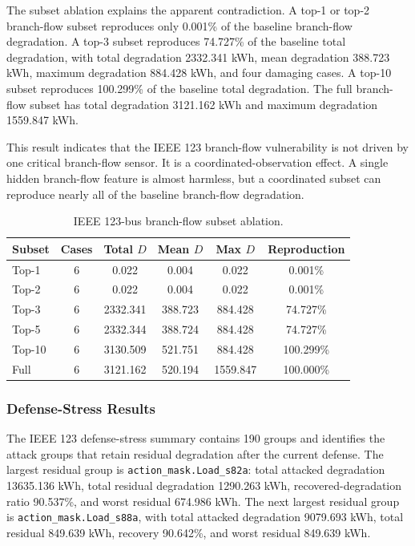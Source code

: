 The subset ablation explains the apparent contradiction. A top-1 or top-2 branch-flow subset reproduces only 0.001\% of the baseline branch-flow degradation. A top-3 subset reproduces 74.727\% of the baseline total degradation, with total degradation 2332.341 kWh, mean degradation 388.723 kWh, maximum degradation 884.428 kWh, and four damaging cases. A top-10 subset reproduces 100.299\% of the baseline total degradation. The full branch-flow subset has total degradation 3121.162 kWh and maximum degradation 1559.847 kWh.

This result indicates that the IEEE 123 branch-flow vulnerability is not driven by one critical branch-flow sensor. It is a coordinated-observation effect. A single hidden branch-flow feature is almost harmless, but a coordinated subset can reproduce nearly all of the baseline branch-flow degradation.

\begin{table}[t]
\centering
\caption{IEEE 123-bus branch-flow subset ablation.}
\label{tab:ieee123_branchflow_subset}
\scriptsize
\begin{tabular}{lccccc}
\hline
Subset & Cases & Total $D$ & Mean $D$ & Max $D$ & Reproduction \\
\hline
Top-1 & 6 & 0.022 & 0.004 & 0.022 & 0.001\% \\
Top-2 & 6 & 0.022 & 0.004 & 0.022 & 0.001\% \\
Top-3 & 6 & 2332.341 & 388.723 & 884.428 & 74.727\% \\
Top-5 & 6 & 2332.344 & 388.724 & 884.428 & 74.727\% \\
Top-10 & 6 & 3130.509 & 521.751 & 884.428 & 100.299\% \\
Full & 6 & 3121.162 & 520.194 & 1559.847 & 100.000\% \\
\hline
\end{tabular}
\end{table}

\subsubsection{Defense-Stress Results}
\label{subsubsec:ieee123_defense_stress}

The IEEE 123 defense-stress summary contains 190 groups and identifies the attack groups that retain residual degradation after the current defense. The largest residual group is \texttt{action\_mask.Load\_s82a}: total attacked degradation 13635.136 kWh, total residual degradation 1290.263 kWh, recovered-degradation ratio 90.537\%, and worst residual 674.986 kWh. The next largest residual group is \texttt{action\_mask.Load\_s88a}, with total attacked degradation 9079.693 kWh, total residual 849.639 kWh, recovery 90.642\%, and worst residual 849.639 kWh.

